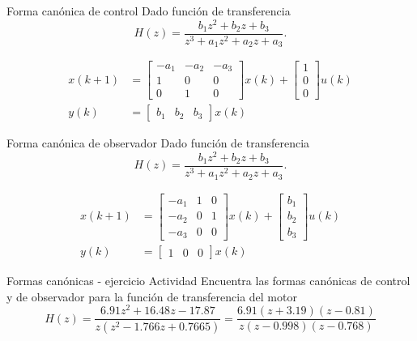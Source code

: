 \documentclass[presentation,aspectratio=1610]{beamer}
\begin{document}
\begin{frame}[label={sec:orgb2760c7}]{Forma canónica de control}
Dado función de transferencia 
\[ H(z) = \frac{b_1 z^2 + b_2 z + b_3}{z^3 + a_1z^2 + a_2z + a_3}.\] 

\begin{align*}
 x(k+1) &= \begin{bmatrix} -a_1 & -a_2 & -a_3\\1 & 0 & 0\\0 & 1 & 0\end{bmatrix} x(k) + \begin{bmatrix}1\\0\\0\end{bmatrix} u(k) \\
 y(k) &= \begin{bmatrix} b_1 & b_2 & b_3 \end{bmatrix} x(k)
 \end{align*}
\end{frame}


\begin{frame}[label={sec:org86f0584}]{Forma canónica de observador}
Dado función de transferencia 
\[ H(z) = \frac{b_1 z^2 + b_2 z + b_3}{z^3 + a_1z^2 + a_2z + a_3}.\] 

\begin{align*}
 x(k+1) &= \begin{bmatrix} -a_1 & 1 & 0\\-a_2 & 0 & 1\\-a_3 & 0 & 0\end{bmatrix} x(k) + \begin{bmatrix}b_1\\b_2\\b_3\end{bmatrix} u(k) \\
 y(k) &= \begin{bmatrix} 1 & 0 & 0 \end{bmatrix} x(k)
 \end{align*}
\end{frame}


\begin{frame}[label={sec:org72d914f}]{Formas canónicas - ejercicio}
\alert{Actividad} Encuentra las formas canónicas de control y de observador para la función de transferencia del motor
\[ H(z) = \frac{6.91z^2 + 16.48z -17.87}{z(z^2 - 1.766z + 0.7665)} = \frac{6.91(z+3.19)(z-0.81)}{z(z-0.998)(z-0.768)}\]
\end{frame}
\end{document}
